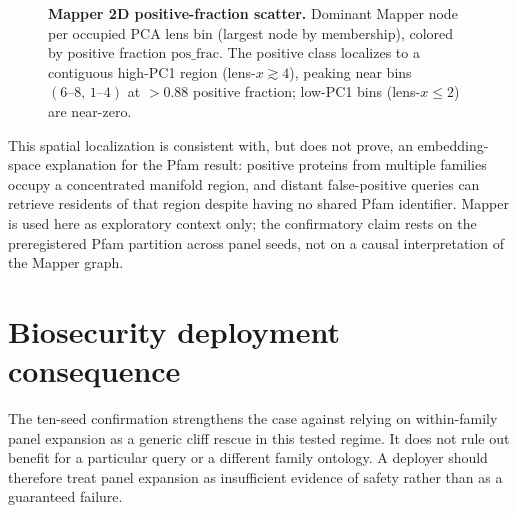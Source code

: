 \documentclass[11pt]{article}
\begin{document}
\begin{figure}[h]\centering
{}
\caption{\textbf{Mapper 2D positive-fraction scatter.} Dominant Mapper node per occupied PCA lens bin (largest node by membership), colored by positive fraction $\text{pos\_frac}$. The positive class localizes to a contiguous high-PC1 region (lens-$x \gtrsim 4$), peaking near bins $(6\text{--}8,\,1\text{--}4)$ at $>0.88$ positive fraction; low-PC1 bins (lens-$x \le 2$) are near-zero.}\label{fig:mapper}
\end{figure}

This spatial localization is consistent with, but does not prove, an embedding-space explanation for the Pfam result: positive proteins from multiple families occupy a concentrated manifold region, and distant false-positive queries can retrieve residents of that region despite having no shared Pfam identifier. Mapper is used here as exploratory context only; the confirmatory claim rests on the preregistered Pfam partition across panel seeds, not on a causal interpretation of the Mapper graph.

\section{Biosecurity deployment consequence}
The ten-seed confirmation strengthens the case against relying on within-family panel expansion as a generic cliff rescue in this tested regime. It does not rule out benefit for a particular query or a different family ontology. A deployer should therefore treat panel expansion as insufficient evidence of safety rather than as a guaranteed failure.
\end{document}
